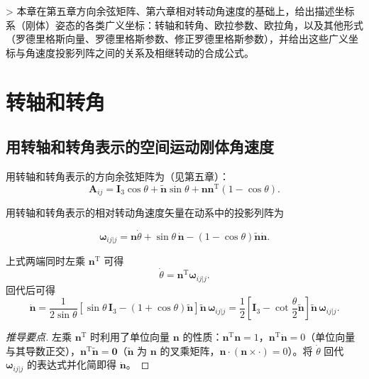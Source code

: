 > 本章在第五章方向余弦矩阵、第六章相对转动角速度的基础上，给出描述坐标系（刚体）姿态的各类广义坐标：转轴和转角、欧拉参数、欧拉角，以及其他形式（罗德里格斯向量、罗德里格斯参数、修正罗德里格斯参数），并给出这些广义坐标与角速度投影列阵之间的关系及相继转动的合成公式。
\section{转轴和转角}
\subsection{用转轴和转角表示的空间运动刚体角速度}
用转轴和转角表示的方向余弦矩阵为（见第五章）：
\[
\boldsymbol{A}_{ij}=\boldsymbol{I}_3\cos\theta+\tilde{\boldsymbol{n}}\sin\theta+\boldsymbol{n}\boldsymbol{n}^{\mathrm{T}}(1-\cos\theta).
\]
\begin{theorem}[用转轴和转角表示的相对转动角速度]
用转轴和转角表示的相对转动角速度矢量在动系中的投影列阵为

\[
\boldsymbol{\omega}_{ij|j}=\boldsymbol{n}\dot{\theta}+\sin\theta\,\dot{\boldsymbol{n}}-(1-\cos\theta)\tilde{\boldsymbol{n}}\dot{\boldsymbol{n}}.
\]
\end{theorem}
上式两端同时左乘 $\boldsymbol{n}^{\mathrm{T}}$ 可得
\[
\dot{\theta}=\boldsymbol{n}^{\mathrm{T}}\boldsymbol{\omega}_{ij|j}.
\]
回代后可得
\[
\dot{\boldsymbol{n}}=\frac{1}{2\sin\theta}\left[\sin\theta\,\boldsymbol{I}_3-(1+\cos\theta)\tilde{\boldsymbol{n}}\right]\tilde{\boldsymbol{n}}\,\boldsymbol{\omega}_{ij|j}
=\frac{1}{2}\left[\boldsymbol{I}_3-\cot\frac{\theta}{2}\tilde{\boldsymbol{n}}\right]\tilde{\boldsymbol{n}}\,\boldsymbol{\omega}_{ij|j}.
\]
\begin{proof}[推导要点]
左乘 $\boldsymbol{n}^{\mathrm{T}}$ 时利用了单位向量 $\boldsymbol{n}$ 的性质：$\boldsymbol{n}^{\mathrm{T}}\boldsymbol{n}=1$，$\boldsymbol{n}^{\mathrm{T}}\dot{\boldsymbol{n}}=0$（单位向量与其导数正交），$\boldsymbol{n}^{\mathrm{T}}\tilde{\boldsymbol{n}}=\boldsymbol{0}$（$\tilde{\boldsymbol{n}}$ 为 $\boldsymbol{n}$ 的叉乘矩阵，$\boldsymbol{n}\cdot(\boldsymbol{n}\times\cdot)=0$）。将 $\dot{\theta}$ 回代 $\boldsymbol{\omega}_{ij|j}$ 的表达式并化简即得 $\dot{\boldsymbol{n}}$。
\end{proof}
